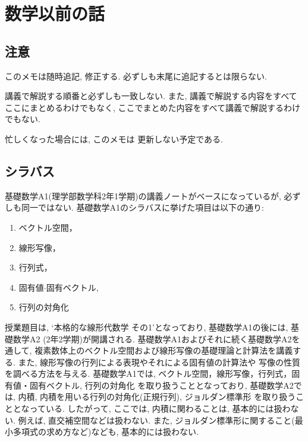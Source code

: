 \frontmatter
\let\originalthesection\thesection
\renewcommand{\thesection}{\alph{section}}

\chapter{数学以前の話}
\section{注意}
このメモは随時追記, 修正する.
必ずしも末尾に追記するとは限らない.

講義で解説する順番と必ずしも一致しない.
また, 講義で解説する内容をすべてここにまとめるわけでもなく,
ここでまとめた内容をすべて講義で解説するわけでもない.

忙しくなった場合には,
このメモは
更新しない予定である.

\section{シラバス}
基礎数学A1(理学部数学科2年1学期)の講義ノートがベースになっているが,
必ずしも同一ではない.
基礎数学A1のシラバスに挙げた項目は以下の通り:
\begin{enumerate}
\item
  ベクトル空間，
\item 線形写像，
\item 行列式，
\item 固有値$\cdot$固有ベクトル,
\item 行列の対角化
\end{enumerate}

授業題目は, `本格的な線形代数学 その1'となっており,
基礎数学A1の後には, 基礎数学A2 (2年2学期)が開講される.
基礎数学A1およびそれに続く基礎数学A2を通して,
複素数体上のベクトル空間および線形写像の基礎理論と計算法を講義する.
また, 線形写像の行列による表現やそれによる固有値の計算法や
写像の性質を調べる方法を与える.
基礎数学A1では,
ベクトル空間，線形写像，行列式，固有値・固有ベクトル, 行列の対角化
を取り扱うこととなっており,
基礎数学A2では,
内積, 内積を用いる行列の対角化(正規行列),
ジョルダン標準形
を取り扱うこととなっている.
したがって,
ここでは, 
内積に関わることは,
基本的には扱わない.
例えば,
直交補空間などは扱わない.
また, ジョルダン標準形に関すること(最小多項式の求め方など)なども,
基本的には扱わない.


